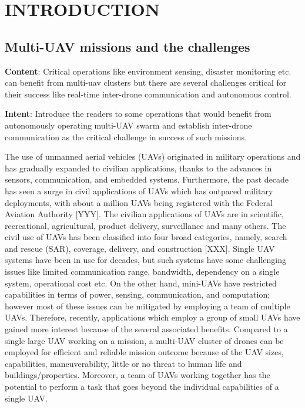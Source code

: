 \chapter{INTRODUCTION}
\label{chap-one}
\section{Multi-UAV missions and the challenges}

\textbf{Content}: Critical operations like environment sensing, disaster monitoring etc. can benefit from multi-uav clusters but there are several challenges critical for their success like real-time inter-drone communication  and autonomous control. 

\textbf{Intent}: Introduce the readers to some operations that would benefit from autonomously operating multi-UAV swarm and establish inter-drone communication as the critical challenge in success of such missions.

The use of unmanned aerial vehicles (UAVs) originated in military operations and has gradually expanded to civilian applications, thanks to the advances in sensors, communication, and embedded systems. Furthermore, the past decade has seen a surge in civil applications of UAVs which has outpaced military deployments, with about a million UAVs being registered with the Federal Aviation Authority [YYY]. The civilian applications of UAVs are in scientific, recreational, agricultural, product delivery, surveillance and many others. The civil use of UAVs has been classified into four broad categories, namely, search and rescue (SAR), coverage, delivery, and construction [XXX].
Single UAV systems have been in use for decades, but such systems have some challenging issues like limited communication range, bandwidth, dependency on a single system, operational cost etc. On the other hand, mini-UAVs have restricted capabilities in terms of power, sensing, communication, and computation; however most of these issues can be mitigated by employing a team of multiple UAVs. Therefore, recently, applications which employ a group of small UAVs have gained more interest because of the several associated benefits. Compared to a single large UAV working on a mission, a multi-UAV cluster of drones can be employed for efficient and reliable mission outcome because of the UAV sizes, capabilities, maneuverability, little or no threat to human life and buildings/properties. Moreover, a team of UAVs working together has the potential to perform a task that goes beyond the individual capabilities of a single UAV. 

